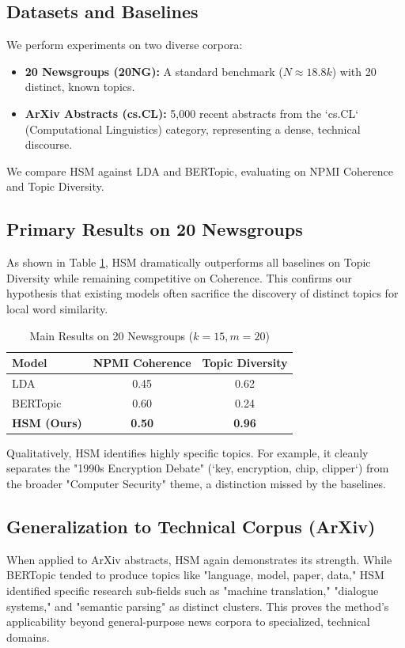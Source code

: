 \documentclass[conference]{IEEEtran}
\theoremstyle{definition}
\begin{document}
\subsection{Datasets and Baselines}
We perform experiments on two diverse corpora:
\begin{itemize}
    \item \textbf{20 Newsgroups (20NG):} A standard benchmark ($N \approx 18.8k$) with 20 distinct, known topics.
    \item \textbf{ArXiv Abstracts (cs.CL):} 5,000 recent abstracts from the `cs.CL` (Computational Linguistics) category, representing a dense, technical discourse.
\end{itemize}
We compare HSM against LDA and BERTopic, evaluating on NPMI Coherence and Topic Diversity.

\subsection{Primary Results on 20 Newsgroups}
As shown in Table \ref{tab:main_results}, HSM dramatically outperforms all baselines on Topic Diversity while remaining competitive on Coherence. This confirms our hypothesis that existing models often sacrifice the discovery of distinct topics for local word similarity.

\begin{table}[h]
\caption{Main Results on 20 Newsgroups ($k=15, m=20$)}
\label{tab:main_results}
\centering
\begin{tabular}{@{}lcc@{}}
\toprule
\textbf{Model} & \textbf{NPMI Coherence} & \textbf{Topic Diversity} \\ \midrule
LDA & 0.45 & 0.62 \\
BERTopic & 0.60 & 0.24 \\
\textbf{HSM (Ours)} & \textbf{0.50} & \textbf{0.96} \\ \bottomrule
\end{tabular}
\end{table}

Qualitatively, HSM identifies highly specific topics. For example, it cleanly separates the "1990s Encryption Debate" (`key, encryption, chip, clipper`) from the broader "Computer Security" theme, a distinction missed by the baselines.

\subsection{Generalization to Technical Corpus (ArXiv)}
When applied to ArXiv abstracts, HSM again demonstrates its strength. While BERTopic tended to produce topics like "language, model, paper, data," HSM identified specific research sub-fields such as "machine translation," "dialogue systems," and "semantic parsing" as distinct clusters. This proves the method's applicability beyond general-purpose news corpora to specialized, technical domains.
\end{document}
